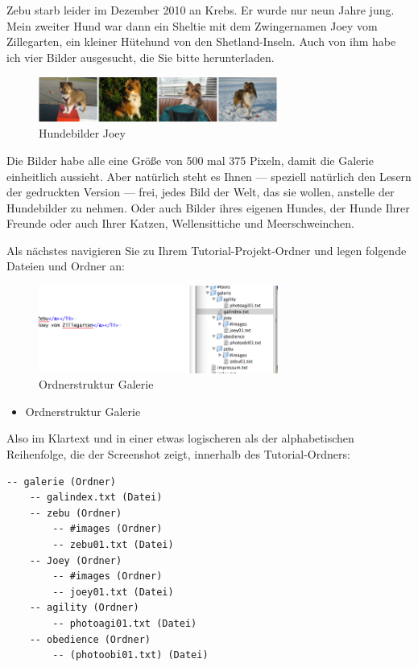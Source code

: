\documentclass[11pt]{report}
\begin{document}
Zebu starb leider im Dezember 2010 an Krebs. Er wurde nur neun Jahre
jung. Mein zweiter Hund war dann ein Sheltie mit dem Zwingernamen Joey
vom Zillegarten, ein kleiner Hütehund von den Shetland-Inseln. Auch
von ihm habe ich vier Bilder ausgesucht, die Sie bitte herunterladen.

\begin{figure}[h!]
\centering
\includegraphics[width=0.7\textwidth]{./images/hundebilder02.png}
\caption{\label{hundebilder02}Hundebilder Joey}
\end{figure}

Die Bilder habe alle eine Größe von 500 mal 375 Pixeln, damit die
Galerie einheitlich aussieht. Aber natürlich steht es Ihnen — speziell
natürlich den Lesern der gedruckten Version — frei, jedes Bild der
Welt, das sie wollen, anstelle der Hundebilder zu nehmen. Oder auch
Bilder ihres eigenen Hundes, der Hunde Ihrer Freunde oder auch Ihrer
Katzen, Wellensittiche und Meerschweinchen.


Als nächstes navigieren Sie zu Ihrem Tutorial-Projekt-Ordner und legen
folgende Dateien und Ordner an:

\begin{figure}[h!]
\centering
\includegraphics[width=0.7\textwidth]{./images/galerie01.png}
\caption{\label{galerie01}Ordnerstruktur Galerie}
\end{figure}

\begin{itemize}
\item Ordnerstruktur Galerie
\end{itemize}

Also im Klartext und in einer etwas logischeren als der alphabetischen
Reihenfolge, die der Screenshot zeigt, innerhalb des Tutorial-Ordners:


\begin{verbatim}
-- galerie (Ordner)
    -- galindex.txt (Datei)
    -- zebu (Ordner)
        -- #images (Ordner)
        -- zebu01.txt (Datei)
    -- Joey (Ordner)
        -- #images (Ordner)
        -- joey01.txt (Datei)
    -- agility (Ordner)
        -- photoagi01.txt (Datei)
    -- obedience (Ordner)
        -- (photoobi01.txt) (Datei)
\end{verbatim}
\end{document}
